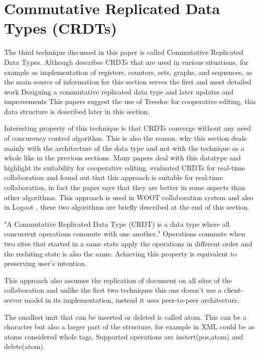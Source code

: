 \documentclass[12pt,oneside]{fithesis2}
\begin{document}
\section{Commutative Replicated Data Types (CRDTs)}
\par The third technique discussed in this paper is called Commutative Replicated Data Types. Although \cite{Shapiro-long} describes CRDTs that are used in various situations, for example as implementation of registers, counters, sets, graphs, and sequences, as the main source of information for this section serves the first and most detailed work Designing a commutative replicated data type \cite{Shapiro-design} and later updates and improvements \cite{Shapiro-editing} \cite{Shapiro-consistency} This papers suggest the use of Treedoc for cooperative editing, this data structure is described later in this section. 
\par Interesting property of this technique is that CRDTs converge without any need of concurency control algorithm. This is also the reason, why this section deals mainly with the architecture of the data type and not with the technique as a whole like in the previous sections. Many papers deal with this datatype and highlight its suitability for cooperative editing. \cite{CRDT-real} evaluated CRDTs for real-time collaboration and found out that this approach is suitable for real-time collaboration, in fact the paper says that they are better in some aspects than other algorithms. This approach is used in WOOT collaboration system \cite{WOOT} and also in Logoot \cite{Logoot}, these two algorithms are briefly described at the end of this section. 
\par "A Commutative Replicated Data Type (CRDT) is a data type where all concurrent operations commute with one another." \cite{Shapiro-design} Operations commute when two sites that started in a same state apply the operations in different order and the resluting state is also the same. Achieving this property is equivalent to preserving user's intention.
\par This approach also assumes the replication of document on all sites of the collaboration and unlike the first two techniques this one doesn't use a client-server model in its implementation, instead it uses peer-to-peer architecture.
\par The smallest unit that can be inserted or deleted is called atom. This can be a character but also a larger part of the structure, for example in XML could be as atoms considered whole tags. Supported operations are instert(pos,atom) and delete(atom). 
\end{document}
